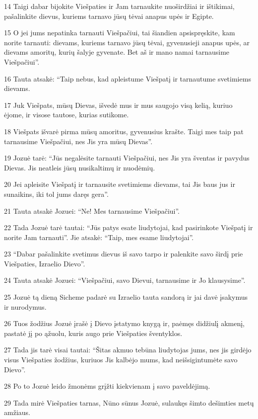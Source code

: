 \par 14 Taigi dabar bijokite Viešpaties ir Jam tarnaukite nuoširdžiai ir ištikimai, pašalinkite dievus, kuriems tarnavo jūsų tėvai anapus upės ir Egipte. 
\par 15 O jei jums nepatinka tarnauti Viešpačiui, tai šiandien apsispręskite, kam norite tarnauti: dievams, kuriems tarnavo jūsų tėvai, gyvenusieji anapus upės, ar dievams amoritų, kurių šalyje gyvenate. Bet aš ir mano namai tarnausime Viešpačiui”. 
\par 16 Tauta atsakė: “Taip nebus, kad apleistume Viešpatį ir tarnautume svetimiems dievams. 
\par 17 Juk Viešpats, mūsų Dievas, išvedė mus ir mus saugojo visą kelią, kuriuo ėjome, ir visose tautose, kurias sutikome. 
\par 18 Viešpats išvarė pirma mūsų amoritus, gyvenusius krašte. Taigi mes taip pat tarnausime Viešpačiui, nes Jis yra mūsų Dievas”. 
\par 19 Jozuė tarė: “Jūs negalėsite tarnauti Viešpačiui, nes Jis yra šventas ir pavydus Dievas. Jis neatleis jūsų nusikaltimų ir nuodėmių. 
\par 20 Jei apleisite Viešpatį ir tarnausite svetimiems dievams, tai Jis baus jus ir sunaikins, iki tol jums daręs gera”. 
\par 21 Tauta atsakė Jozuei: “Ne! Mes tarnausime Viešpačiui”. 
\par 22 Tada Jozuė tarė tautai: “Jūs patys esate liudytojai, kad pasirinkote Viešpatį ir norite Jam tarnauti”. Jie atsakė: “Taip, mes esame liudytojai”. 
\par 23 “Dabar pašalinkite svetimus dievus iš savo tarpo ir palenkite savo širdį prie Viešpaties, Izraelio Dievo”. 
\par 24 Tauta atsakė Jozuei: “Viešpačiui, savo Dievui, tarnausime ir Jo klausysime”. 
\par 25 Jozuė tą dieną Sicheme padarė su Izraelio tauta sandorą ir jai davė įsakymus ir nurodymus. 
\par 26 Tuos žodžius Jozuė įrašė į Dievo įstatymo knygą ir, paėmęs didžiulį akmenį, pastatė jį po ąžuolu, kuris augo prie Viešpaties šventyklos. 
\par 27 Tada jis tarė visai tautai: “Šitas akmuo tebūna liudytojas jums, nes jis girdėjo visus Viešpaties žodžius, kuriuos Jis kalbėjo mums, kad neišsigintumėte savo Dievo”. 
\par 28 Po to Jozuė leido žmonėms grįžti kiekvienam į savo paveldėjimą. 
\par 29 Tada mirė Viešpaties tarnas, Nūno sūnus Jozuė, sulaukęs šimto dešimties metų amžiaus. 
